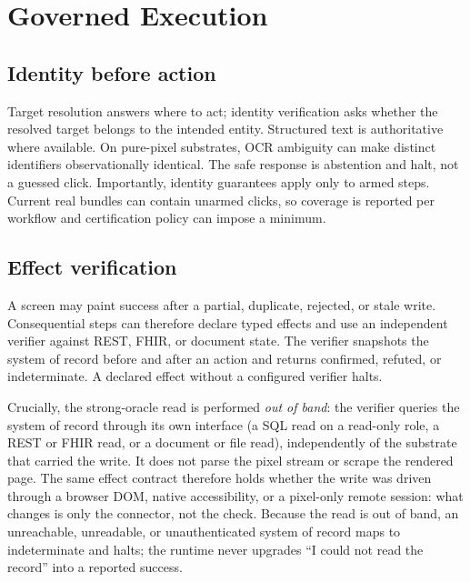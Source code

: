 \section{Governed Execution}
\label{sec:governance}

\subsection{Identity before action}
Target resolution answers where to act; identity verification asks whether the
resolved target belongs to the intended entity. Structured text is authoritative
where available. On pure-pixel substrates, OCR ambiguity can make distinct
identifiers observationally identical. The safe response is abstention and
halt, not a guessed click. Importantly, identity guarantees apply only to armed
steps. Current real bundles can contain unarmed clicks, so coverage is reported
per workflow and certification policy can impose a minimum.

\subsection{Effect verification}
A screen may paint success after a partial, duplicate, rejected, or stale write.
Consequential steps can therefore declare typed effects and use an independent
verifier against REST, FHIR, or document state. The verifier snapshots the
system of record before and after an action and returns confirmed, refuted, or
indeterminate. A declared effect without a configured verifier halts.

Crucially, the strong-oracle read is performed \emph{out of band}: the verifier
queries the system of record through its own interface (a SQL read on a
read-only role, a REST or FHIR read, or a document or file read), independently
of the substrate that carried the write. It does not parse the pixel stream or
scrape the rendered page. The same effect contract therefore holds whether the
write was driven through a browser DOM, native accessibility, or a pixel-only
remote session: what changes is only the connector, not the check. Because the
read is out of band, an unreachable, unreadable, or unauthenticated system of
record maps to indeterminate and halts; the runtime never upgrades ``I could not
read the record'' into a reported success.

